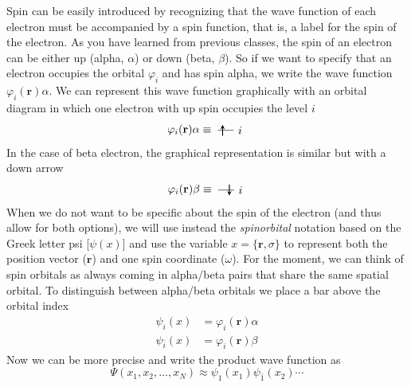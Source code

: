 \documentclass[../Main/chem371-notes.tex]{subfiles}
\begin{document}
Spin can be easily introduced by recognizing that the wave function of each electron must be accompanied by a spin function, that is, a label for the spin of the electron.
As you have learned from previous classes, the spin of an electron can be either up (alpha, $\alpha$) or down (beta, $\beta$).
So if we want to specify that an electron occupies the orbital $\varphi_i$ and has spin alpha, we write the wave function $\varphi_i(\mathbf{r}) \alpha$.
We can represent this wave function graphically with an orbital diagram in which one electron with up spin occupies the level $i$
\begin{equation}
\varphi_i(\mathbf{r}) \alpha
\equiv \;
\begin{tikzpicture}[baseline={([yshift=-.5ex]current bounding box.center)},]
    \draw (0,0.5) -- (0.5,0.5);
    \draw[thick,->,>=stealth] (0.15,0.325) -- (0.15,0.675);
    \draw (0.7,0.5) node{$i$};
\end{tikzpicture}
\end{equation}
In the case of beta electron, the graphical representation is similar but with a down arrow
\begin{equation}
\varphi_i(\mathbf{r}) \beta
\equiv \;
\begin{tikzpicture}[baseline={([yshift=-.5ex]current bounding box.center)},]
    \draw (0,0.5) -- (0.5,0.5);
    \draw[thick,<-,>=stealth] (0.35,0.325) -- (0.35,0.675);
    \draw (0.7,0.5) node{$i$};
\end{tikzpicture}
\end{equation}
When we do not want to be specific about the spin of the electron (and thus allow for both options), we will use instead the \emph{spinorbital} notation based on the Greek letter psi [$\psi(x)$] and use the variable $x = \{ \mathbf{r},\sigma\}$ to represent both the position vector ($\mathbf{r}$) and one spin coordinate ($\omega$).
For the moment, we can think of spin orbitals as always coming in alpha/beta pairs that share the same spatial orbital. To distinguish between alpha/beta orbitals we place a bar above the orbital index
\begin{align}
\psi_i(x) & = \varphi_i(\mathbf{r}) \alpha \\
\psi_{\bar{i}}(x) & = \varphi_i(\mathbf{r}) \beta
\end{align}
Now we can be more precise and write the product wave function as
\begin{equation}
\label{eq:hartree_prod_spin}
\Psi(x_1, x_2, \ldots, x_N) \approx \psi_1(x_1) \psi_{\bar{1}}(x_2) \cdots
\end{equation}
\end{document}
